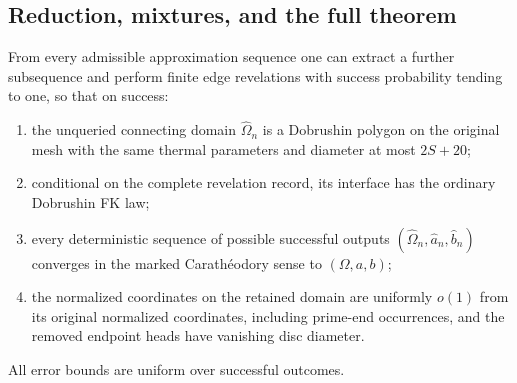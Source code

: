 \subsection{Reduction, mixtures, and the full theorem}

\begin{proposition}
\label{loc:reduction}
From every admissible approximation sequence one can extract
a further subsequence and perform finite edge revelations
with success probability tending to one, so that on success:
\begin{enumerate}
\item the unqueried connecting domain \(\widehat\Omega_n\)
is a Dobrushin polygon on the original mesh with the
same thermal parameters and diameter at most \(2S+20\);
\item conditional on the complete revelation record, its
interface has the ordinary Dobrushin FK law;
\item every deterministic sequence of possible successful
outputs \((\widehat\Omega_n,\widehat a_n,\widehat b_n)\)
converges in the marked Carath\'eodory sense to
\((\Omega,a,b)\);
\item the normalized coordinates on the retained domain
are uniformly \(o(1)\) from its original normalized
coordinates, including prime-end occurrences, and
the removed endpoint heads have vanishing disc
diameter.
\end{enumerate}
All error bounds are uniform over successful outcomes.
\end{proposition}

